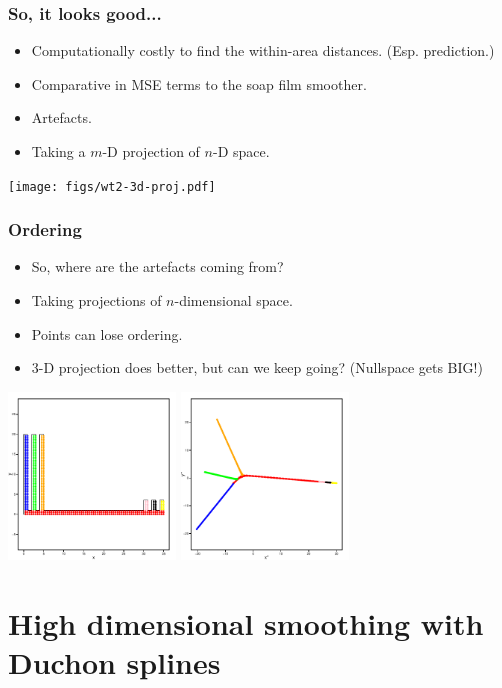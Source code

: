 \documentclass[ignorenonframetext]{beamer} %
\newcommand{\bi}{\begin{itemize}}
\newcommand{\ei}{\end{itemize}}
\begin{document}
\begin{frame}
	\frametitle{So, it looks good...}
          \bi
            \item Computationally costly to find the within-area distances. (Esp. prediction.)
            \item Comparative in MSE terms to the soap film smoother.
            \item Artefacts.
            \item Taking a $m$-D projection of $n$-D space.
           \ei
            \centering
              \texttt{[image: figs/wt2-3d-proj.pdf]}\\           
\end{frame}



\begin{frame}
	\frametitle{Ordering}
	\bi
		\item So, where are the artefacts coming from?
		\item Taking projections of $n$-dimensional space.
		\item Points can lose ordering.
		\item 3-D projection does better, but can we keep going? (Nullspace gets BIG!)
	\ei
	\centering
              \includegraphics[height=1.75in]{figs/comb.pdf} \includegraphics[height=1.75in]{figs/comb-2d.pdf}
\end{frame}


\section{High dimensional smoothing with Duchon splines}
\end{document}
